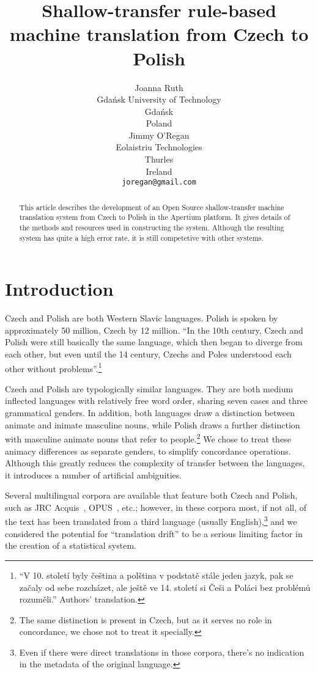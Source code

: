 \documentclass[11pt]{article}
\title{Shallow-transfer rule-based machine translation from Czech to Polish}
\author{Joanna Ruth\\
  Gdańsk University of Technology \\
  Gdańsk \\
  Poland \\
  \And
  Jimmy O'Regan \\
  Eolaistriu Technologies \\
  Thurles \\
  Ireland \\  
  {\tt joregan@gmail.com}}
\date{}
\begin{document}
\maketitle

\begin{abstract}
This article describes the development of an Open Source shallow-transfer machine translation
system from Czech to Polish in the Apertium platform. It gives details of the
methods and resources used in constructing the system. Although the resulting system
has quite a high error rate, it is still competetive with other systems.
\end{abstract}

\section{Introduction}

Czech and Polish are both Western Slavic languages. Polish is spoken by
approximately 50 million, Czech by 12 million.
``In the 10th century, Czech and Polish were still basically the same language, 
which then began to diverge from each other, but even until the 14 century, 
Czechs and Poles understood each other without problems''.\footnote{``V 10. 
století byly čeština a polština v podstatě stále jeden jazyk, pak se začaly 
od sebe rozcházet, ale ještě ve 14. století si Češi a Poláci bez problémů rozuměli.''
Authors' translation.}~\citep{wiki:polstina}

Czech and Polish are typologically similar languages. They are both medium inflected 
languages with relatively free word order, sharing seven cases and three grammatical 
genders. In addition, both languages draw a distinction between animate and inimate 
masculine nouns, while Polish draws a further distinction with masculine animate 
nouns that refer to people.\footnote{The same distinction is present in Czech, but
as it serves no role in concordance, we chose not to treat it specially.}
We chose to 
treat these animacy differences
as separate genders, to simplify concordance operations. 
Although this greatly reduces the complexity of transfer between 
the languages, it introduces a number of artificial ambiguities.

Several multilingual corpora are available that feature both
Czech and Polish, such as JRC Acquis~\citep{Steinberger2006}, 
OPUS~\citep{Tiedemann2009}, etc.; however, in these corpora
most, if not all, of the text has been translated from a third language
(usually English),\footnote{Even if there were direct translations in those 
corpora, there's no indication in the metadata of the original language.}
and we considered the potential for ``translation drift'' to be a 
serious limiting factor in the creation of a statistical system.
\end{document}
